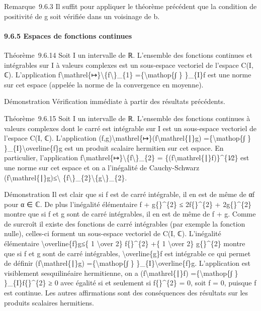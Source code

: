 \documentclass[]{article}
\begin{document}
Remarque~9.6.3 Il suffit pour appliquer le théorème précédent que la
condition de positivité de g soit vérifiée dans un voisinage de b.

\paragraph{9.6.5 Espaces de fonctions continues}

Théorème~9.6.14 Soit I un intervalle de ℝ. L'ensemble des fonctions
continues et intégrables sur I à valeurs complexes est un sous-espace
vectoriel de l'espace C(I, ℂ). L'application
f\textbackslash{}mathrel\{↦\}\textbackslash{}\textbar{}\{f\textbackslash{}\textbar{}\}\_\{1\}
=\{\textbackslash{}mathop\{∫ \} \}\_\{I\}\textbar{}f\textbar{} est une
norme sur cet espace (appelée la norme de la convergence en moyenne).

Démonstration Vérification immédiate à partir des résultats précédents.

Théorème~9.6.15 Soit I un intervalle de ℝ. L'ensemble des fonctions
continues à valeurs complexes dont le carré est intégrable sur I est un
sous-espace vectoriel de l'espace C(I, ℂ). L'application
(f,g)\textbackslash{}mathrel\{↦\}(f\textbackslash{}mathrel\{∣\}g)
=\{\textbackslash{}mathop\{∫ \} \}\_\{I\}\textbackslash{}overline\{f\}g
est un produit scalaire hermitien sur cet espace. En particulier,
l'application
f\textbackslash{}mathrel\{↦\}\textbackslash{}\textbar{}\{f\textbackslash{}\textbar{}\}\_\{2\}
= \{(f\textbackslash{}mathrel\{∣\}f)\}\^{}\{1∕2\} est une norme sur cet
espace et on a l'inégalité de Cauchy-Schwarz
\textbar{}(f\textbackslash{}mathrel\{∣\}g)\textbar{}≤\textbackslash{}\textbar{}
\{f\textbackslash{}\textbar{}\}\_\{2\}\textbackslash{}\textbar{}\{g\textbackslash{}\textbar{}\}\_\{2\}.

Démonstration Il est clair que si f est de carré intégrable, il en est
de même de αf pour α ∈ ℂ. De plus l'inégalité élémentaire \textbar{}f +
g\{\textbar{}\}\^{}\{2\} ≤ 2\textbar{}f\{\textbar{}\}\^{}\{2\} +
2\textbar{}g\{\textbar{}\}\^{}\{2\} montre que si f et g sont de carré
intégrables, il en est de même de f + g. Comme de surcroît il existe des
fonctions de carré intégrables (par exemple la fonction nulle),
celles-ci forment un sous-espace vectoriel de C(I, ℂ). L'inégalité
élémentaire \textbar{}\textbackslash{}overline\{f\}g\textbar{}≤\{ 1
\textbackslash{}over 2\} \textbar{}f\{\textbar{}\}\^{}\{2\} +\{ 1
\textbackslash{}over 2\} \textbar{}g\{\textbar{}\}\^{}\{2\} montre que
si f et g sont de carré intégrables, \textbackslash{}overline\{g\}f est
intégrable ce qui permet de définir (f\textbackslash{}mathrel\{∣\}g)
=\{\textbackslash{}mathop\{∫ \} \}\_\{I\}\textbackslash{}overline\{f\}g.
L'application est visiblement sesquilinéaire hermitienne, on a
(f\textbackslash{}mathrel\{∣\}f) =\{\textbackslash{}mathop\{∫ \}
\}\_\{I\}\textbar{}f\{\textbar{}\}\^{}\{2\} ≥ 0 avec égalité si et
seulement si \textbar{}f\{\textbar{}\}\^{}\{2\} = 0, soit f = 0, puisque
f est continue. Les autres affirmations sont des conséquences des
résultats sur les produits scalaires hermitiens.
\end{document}
